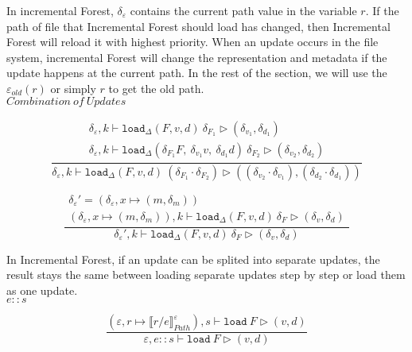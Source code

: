 \documentclass[10pt,twoside,a4paper]{article}
\theoremstyle{theorem}
\theoremstyle{lemma}
\theoremstyle{property}
\theoremstyle{definition}
\theoremstyle{assumption}
\begin{document}
In incremental Forest, $\delta_\varepsilon$ contains the current path value in the variable $r$. 
If the path of file that Incremental Forest should load has changed, then Incremental Forest will reload it with highest priority.
When an update occurs in the file system, incremental Forest will change the representation and metadata if the update happens at the current path. 
In the rest of the section, we will use the $\varepsilon_{old}(r)$ or simply $r$ to get the old path.\\

$\boxed{Combination ~ of ~ Updates}$

\begin{displaymath}
	\frac{\begin{array}{c}
		\delta_\varepsilon, k \vdash \mathtt{load}_\Delta (F,v,d)~ \delta_{F_1} \rhd (\delta_{v_1}, \delta_{d_1})\\
		\delta_\varepsilon, k \vdash \mathtt{load}_\Delta (\delta_{F_1} F,~\delta_{v_1} v,~\delta_{d_1} d)~ \delta_{F_2} \rhd (\delta_{v_2}, \delta_{d_2})
	\end{array}}
	{\delta_\varepsilon, k \vdash \mathtt{load}_\Delta (F,v,d)~ (\delta_{F_1} \cdot \delta_{F_2}) \rhd ((\delta_{v_2} \cdot \delta_{v_1}), (\delta_{d_2} \cdot \delta_{d_1}))}
\end{displaymath}

\begin{displaymath}
	\frac{\begin{array}{c}
		{\delta_\varepsilon}' = (\delta_\varepsilon, x \mapsto (m, \delta_m))\\
		(\delta_\varepsilon, x \mapsto (m, \delta_m)), k \vdash \mathtt{load}_\Delta (F,v,d)~ \delta_F \rhd (\delta_v, \delta_d)
	\end{array}}
	{{\delta_\varepsilon}', k \vdash \mathtt{load}_\Delta (F,v,d)~ \delta_F \rhd (\delta_v, \delta_d)}
\end{displaymath}

In Incremental Forest, if an update can be splited into separate updates, the result stays the same between loading separate updates step by step or load them as one update.\\

$\boxed{e::s}$

\begin{displaymath}
	\frac{
		(\varepsilon, r \mapsto \llbracket r/e \rrbracket^\varepsilon_{Path}) , s \vdash \mathtt{load}~F \rhd (v, d)
	}
	{
		\varepsilon, e::s \vdash \mathtt{load}~F \rhd (v,d)
	}
\end{displaymath}
\end{document}
